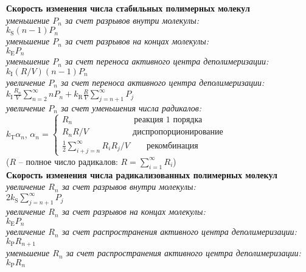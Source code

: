 \begin{center}
	\textbf{Скорость изменения числа стабильных полимерных молекул} \\
	\textit{уменьшение $P_n$ за счет разрывов внутри молекулы:} \\
	$k_\mathrm{S} (n-1) P_n$ \\
	\textit{уменьшение $P_n$ за счет разрывов на концах молекулы:} \\
	$k_\mathrm{E} P_n$ \\
	\textit{уменьшение $P_n$ за счет переноса активного центра деполимеризации:} \\
	$k_\mathrm{I}(R / V)(n-1) P_n$ \\
	\textit{увеличение $P_n$ за счет переноса активного центра деполимеризации:} \\
	{$\displaystyle k_\mathrm{I} \frac{R_n}{V} \sum_{n=2}^{\infty} n P_n + k_{\mathrm{R}} \frac{R}{V} \sum_{j=n+1}^{\infty} P_j$} \\
	\textit{увеличение $P_n$ за счет уменьшения числа радикалов:} \\
	$k_\mathrm{T} \alpha_n$, $\alpha_n = \left\{
	\begin{array}{l}
		R_n \quad\quad\quad\quad\quad\quad\quad\: \text{реакция 1 порядка} \\
		R_n R / V \quad\quad\quad\quad\quad\: \text{диспропорционирование} \\
		{\displaystyle \frac{1}{2} \sum_{i+j=n}^{\infty} R_i R_j / V} \quad\quad \text{рекомбинация}
	\end{array}\right.$ \\
	($R$ -- полное число радикалов: {$\displaystyle R = \sum_{i=1}^{\infty} R_i$}) \\
	\textbf{Скорость изменения числа радикализованных полимерных молекул} \\
	\textit{увеличение $R_n$ за счет разрывов внутри молекулы:} \\
	$2 k_\mathrm{S} \sum_{j=n+1}^{\infty} P_j$ \\
	\textit{увеличение $R_n$ за счет разрывов на концах молекулы:} \\
	$k_\mathrm{E} P_n$ \\
	\textit{увеличение $R_n$ за счет распространения активного центра деполимеризации:} \\
	$k_\mathrm{P} R_{n+1}$ \\
	\textit{уменьшение $R_n$ за счет распространения активного центра деполимеризации:} \\
	$k_\mathrm{P} R_n$ \\

\end{center}
